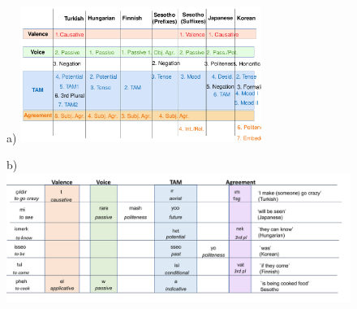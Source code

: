 \documentclass[11pt,letterpaper]{article}
\begin{document}
 \begin{figure}
 a)
 \includegraphics[width=0.7\textwidth]{figures/slots.pdf}
 
 b)     \includegraphics[width=\textwidth]{figures/verb-morphemes.pdf}
 


\end{figure}
\end{document}
